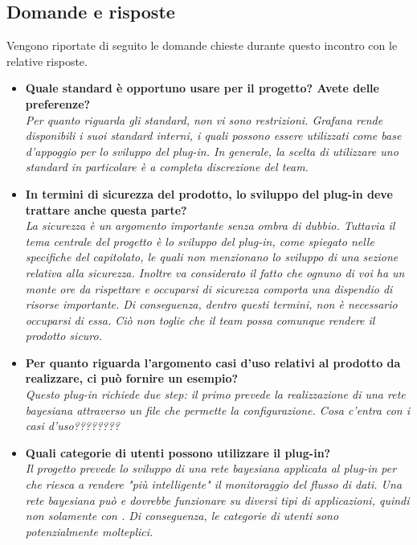 \subsection{Domande e risposte}
Vengono riportate di seguito le domande chieste durante questo incontro con le relative risposte. 
\begin{itemize}
\item\textbf{Quale standard è opportuno usare per il progetto? Avete delle preferenze?}\\
\emph{Per quanto riguarda gli standard, non vi sono restrizioni.  Grafana rende disponibili i suoi standard interni, i quali possono essere utilizzati come base d'appoggio per lo sviluppo del plug-in. In generale, la scelta di utilizzare uno standard in particolare è a completa discrezione del team.}

\item\textbf{In termini di sicurezza del prodotto, lo sviluppo del plug-in deve trattare anche questa parte?}\\
\emph{La sicurezza è un argomento importante senza ombra di dubbio. Tuttavia il tema centrale del progetto è lo sviluppo del plug-in, come spiegato nelle specifiche del capitolato, le quali non menzionano lo sviluppo di una sezione relativa alla sicurezza. Inoltre va considerato il fatto che ognuno di voi ha un monte ore da rispettare e occuparsi di sicurezza comporta una dispendio di risorse importante. Di conseguenza, dentro questi termini, non è necessario occuparsi di essa. Ciò non toglie che il team possa comunque rendere il prodotto sicuro.}

\item\textbf{Per quanto riguarda l'argomento casi d'uso relativi al prodotto da realizzare, ci può fornire un esempio?}\\
\emph{Questo plug-in richiede due step: il primo prevede la realizzazione di una rete bayesiana attraverso un file  che permette la configurazione. Cosa c'entra con i casi d'uso????????}

\item\textbf{Quali categorie di utenti possono utilizzare il plug-in?} \\
\emph{Il progetto prevede lo sviluppo di una rete bayesiana applicata al plug-in per  che riesca a rendere "più intelligente" il monitoraggio del flusso di dati. Una rete bayesiana può e dovrebbe funzionare su diversi tipi di applicazioni, quindi non solamente con . Di conseguenza, le categorie di utenti sono potenzialmente molteplici.}


\end{itemize}
